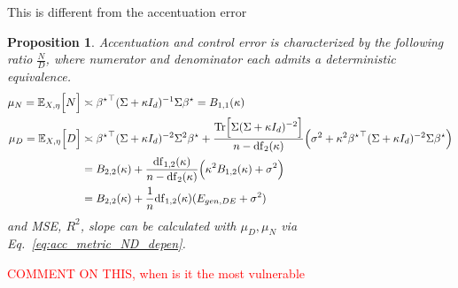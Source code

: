 \documentclass{article}
\newcommand{\red}[1]{\textcolor{red}{#1}}
\providecommand{\propositionname}{Proposition}
\theoremstyle{plain}
\newtheorem{prop}[thm]{\propositionname}
\theoremstyle{definition}
\begin{document}
This is different from the accentuation error
\begin{prop}\label{prop:pix_ridge_acc_ND}
Accentuation and control error is characterized by the following ratio
$\frac{N}{D}$, where numerator and denominator each admits a deterministic
equivalence.
\begin{align}\label{eq:pix_ridge_ND_DE_rel}
\mu_{N}=\mathbb{E}_{X,\eta}\Big[N\Big] & \asymp{{\beta^{\star}}}^{\top}(\Sigma+\kappa I_{d})^{-1}\Sigma{\beta^{\star}} =B_{1,1}(\kappa)\\
\mu_{D}=\mathbb{E}_{X,\eta}\Big[D\Big] & \asymp{{\beta^{\star}}}^{\top}(\Sigma+\kappa I_{d})^{-2}\Sigma^{2}{\beta^{\star}}+\frac{\mathrm{Tr}\Big[\Sigma(\Sigma+\kappa I_{d})^{-2}\Big]}{n-\mathrm{df}_{2}(\kappa)}\Big(\sigma^{2}+\kappa^{2}{{\beta^{\star}}}^{\top}(\Sigma+\kappa I_{d})^{-2}\Sigma{\beta^{\star}}\Big)\notag\\
 & =B_{2,2}(\kappa)+\frac{\mathrm{df}_{1,2}(\kappa)}{n-\mathrm{df}_{2}(\kappa)}\Big(\kappa^{2}B_{1,2}(\kappa)+\sigma^{2}\Big)\\
 & =B_{2,2}(\kappa)+\frac{1}{n}\mathrm{df}_{1,2}(\kappa)(E_{gen,DE}+\sigma^{2})
\end{align}
and MSE, $R^2$, slope can be calculated with $\mu_D,\mu_N$ via Eq.~\ref{eq:acc_metric_ND_depen}.
\end{prop}

\red{COMMENT ON THIS, when is it the most vulnerable}
\end{document}

